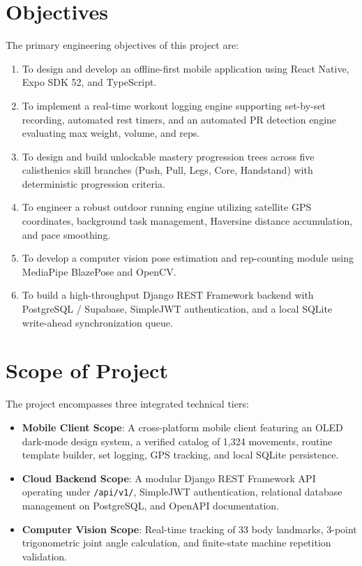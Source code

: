 \documentclass[12pt,a4paper]{report}
\begin{document}
\section{Objectives}
The primary engineering objectives of this project are:
\begin{enumerate}
    \item To design and develop an offline-first mobile application using React Native, Expo SDK 52, and TypeScript.
    \item To implement a real-time workout logging engine supporting set-by-set recording, automated rest timers, and an automated PR detection engine evaluating max weight, volume, and reps.
    \item To design and build unlockable mastery progression trees across five calisthenics skill branches (Push, Pull, Legs, Core, Handstand) with deterministic progression criteria.
    \item To engineer a robust outdoor running engine utilizing satellite GPS coordinates, background task management, Haversine distance accumulation, and pace smoothing.
    \item To develop a computer vision pose estimation and rep-counting module using MediaPipe BlazePose and OpenCV.
    \item To build a high-throughput Django REST Framework backend with PostgreSQL / Supabase, SimpleJWT authentication, and a local SQLite write-ahead synchronization queue.
\end{enumerate}

\section{Scope of Project}
The project encompasses three integrated technical tiers:
\begin{itemize}
    \item \textbf{Mobile Client Scope}: A cross-platform mobile client featuring an OLED dark-mode design system, a verified catalog of 1,324 movements, routine template builder, set logging, GPS tracking, and local SQLite persistence.
    \item \textbf{Cloud Backend Scope}: A modular Django REST Framework API operating under \texttt{/api/v1/}, SimpleJWT authentication, relational database management on PostgreSQL, and OpenAPI documentation.
    \item \textbf{Computer Vision Scope}: Real-time tracking of 33 body landmarks, 3-point trigonometric joint angle calculation, and finite-state machine repetition validation.
\end{itemize}
\end{document}
